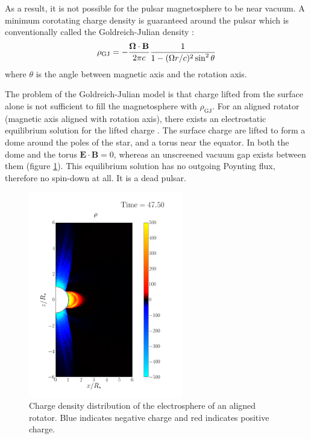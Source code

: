 As a result, it is not possible for the pulsar magnetosphere to be near vacuum.
A minimum corotating charge density is guaranteed around the pulsar which is
conventionally called the Goldreich-Julian density \citep{goldreich_pulsar_1969}:
\begin{equation}
  \label{eq:gj-density}
  \rho_\mathrm{GJ} = -\frac{\bm{\Omega}\cdot \mathbf{B}}{2\pi c}\frac{1}{1 - (\Omega r/c)^2\sin^{2}\theta}
\end{equation}
where $\theta$ is the angle between magnetic axis and the rotation axis.

The problem of the Goldreich-Julian model is that charge lifted from the
surface alone is not sufficient to fill the magnetosphere with
$\rho_\mathrm{GJ}$. For an aligned rotator (magnetic axis aligned with rotation
axis), there exists an electrostatic equilibrium solution for the lifted charge
\citep{jackson_new_1976, krause-polstorff_pulsar_1985,
  krause-polstorff_electrosphere_1985}. The surface charge are lifted to form a
dome around the poles of the star, and a torus near the equator. In both the
dome and the torus $\mathbf{E}\cdot \mathbf{B} = 0$, whereas an unscreened
vacuum gap exists between them (figure \ref{fig:electrosphere-intro}). This
equilibrium solution has no outgoing Poynting flux, therefore no spin-down at
all. It is a dead pulsar.

\begin{figure}[h]
  \centering
  \includegraphics[width=0.6\textwidth]{pics/intro/electrosphere-new.png}
  \caption[Charge density distribution of the electrosphere of an aligned
  rotator.]{Charge density distribution of the electrosphere of an aligned
    rotator. Blue indicates negative charge and red indicates positive charge.}
  \label{fig:electrosphere-intro}
\end{figure}

